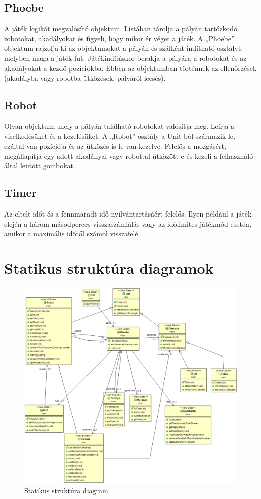 \subsection{Phoebe}
A játék logikát megvalósító objektum. Listában tárolja a pályán tartózkodó robotokat, akadályokat és figyeli, hogy mikor ér véget a játék. A „Phoebe” objektum rajzolja ki az objektumokat a pályán és szálként indítható osztályt, melyben maga a játék fut. Játékindításkor berakja a pályára a robotokat és az akadályokat a kezdő pozíciókba. Ebben az objektumban történnek az ellenőrzések (akadályba vagy robotba ütközések, pályáról leesés).
\subsection{Robot}
Olyan objektum, mely a pályán található robotokat valósítja meg. Leírja a viselkedésüket és a kezelésüket. A „Robot” osztály a Unit-ból származik le, ezáltal van pozíciója és az ütközés is le van kezelve. Felelős a mozgásért, megállapítja egy adott akadállyal vagy robottal ütközött-e és kezeli a felhasználó által leütött gombokat.
\subsection{Timer}
Az eltelt időt és a fennmaradt idő nyilvántartásáért felelős. Ilyen például a játék elején a három másodperces visszaszámlálás vagy az időlimites játékmód esetén, amikor a maximális időtől számol visszafelé.

\section{Statikus struktúra diagramok}

\begin{figure}[h]
\begin{center}
\includegraphics[width=17cm]{images/struktdiagram.PNG}
\caption{Statikus struktúra diagram}
\label{fig:example3}
\end{center}
\end{figure}
\pagebreak


